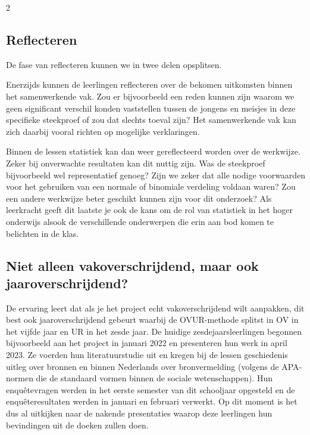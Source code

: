 \begin{multicols}{2}
    
\subsection*{Reflecteren}
    De fase van reflecteren kunnen we in twee delen opsplitsen.
            
    Enerzijds kunnen de leerlingen reflecteren over de bekomen uitkomsten binnen het samenwerkende vak. Zou er bijvoorbeeld een reden kunnen zijn waarom we geen significant verschil konden vaststellen tussen de jongens en meisjes in deze specifieke steekproef of zou dat slechts toeval zijn? Het samenwerkende vak kan zich daarbij vooral richten op mogelijke verklaringen.
    
    Binnen de lessen statistiek kan dan weer gereflecteerd worden over de werkwijze. Zeker bij onverwachte resultaten kan dit nuttig zijn. Was de steekproef bijvoorbeeld wel representatief genoeg? Zijn we zeker dat alle nodige voorwaarden voor het gebruiken van een normale of binomiale verdeling voldaan waren? Zou een andere werkwijze beter geschikt kunnen zijn voor dit onderzoek? Als leerkracht geeft dit laatste je ook de kans om de rol van statistiek in het hoger onderwijs alsook de verschillende onderwerpen die erin aan bod komen te belichten in de klas.
    
\subsection*{Niet alleen vakoverschrijdend, maar ook jaaroverschrijdend?}


    De ervaring leert dat als je het project echt vakoverschrijdend wilt aanpakken, dit best ook jaaroverschrijdend gebeurt waarbij de OVUR-methode splitst in OV in het vijfde jaar en UR in het zesde jaar. De huidige zesdejaarsleerlingen begonnen bijvoorbeeld aan het project in januari 2022 en presenteren hun werk in april 2023. Ze voerden hun literatuurstudie uit en kregen bij de lessen geschiedenis uitleg over bronnen en binnen Nederlands over bronvermelding (volgens de APA-normen die de standaard vormen binnen de sociale wetenschappen). Hun enqu\^etevragen werden in het eerste semester van dit schooljaar opgesteld en de enqu\^eteresultaten werden in januari en februari verwerkt. Op dit moment is het dus al uitkijken naar de nakende presentaties waarop deze leerlingen hun bevindingen uit de doeken zullen doen.


\end{multicols}
